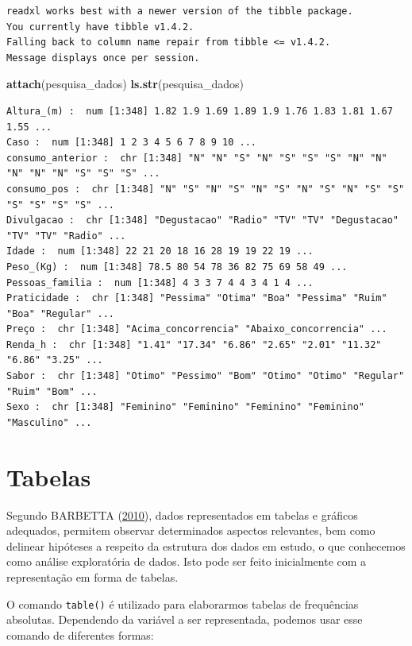 \documentclass[12pt,brazil,oneside]{book}
\newenvironment{Shaded}{\begin{snugshade}}{\end{snugshade}}
\newcommand{\KeywordTok}[1]{\textcolor[rgb]{0.13,0.29,0.53}{\textbf{#1}}}
\newcommand{\NormalTok}[1]{#1}
\begin{document}
\begin{verbatim}
readxl works best with a newer version of the tibble package.
You currently have tibble v1.4.2.
Falling back to column name repair from tibble <= v1.4.2.
Message displays once per session.
\end{verbatim}

\begin{Shaded}
\begin{Highlighting}[]
\KeywordTok{attach}\NormalTok{(pesquisa_dados)}
\KeywordTok{ls.str}\NormalTok{(pesquisa_dados)}
\end{Highlighting}
\end{Shaded}

\begin{verbatim}
Altura_(m) :  num [1:348] 1.82 1.9 1.69 1.89 1.9 1.76 1.83 1.81 1.67 1.55 ...
Caso :  num [1:348] 1 2 3 4 5 6 7 8 9 10 ...
consumo_anterior :  chr [1:348] "N" "N" "S" "N" "S" "S" "S" "N" "N" "N" "N" "N" "S" "S" "S" ...
consumo_pos :  chr [1:348] "N" "S" "N" "S" "N" "S" "N" "S" "N" "S" "S" "S" "S" "S" "S" ...
Divulgacao :  chr [1:348] "Degustacao" "Radio" "TV" "TV" "Degustacao" "TV" "TV" "Radio" ...
Idade :  num [1:348] 22 21 20 18 16 28 19 19 22 19 ...
Peso_(Kg) :  num [1:348] 78.5 80 54 78 36 82 75 69 58 49 ...
Pessoas_familia :  num [1:348] 4 3 3 7 4 4 3 4 1 4 ...
Praticidade :  chr [1:348] "Pessima" "Otima" "Boa" "Pessima" "Ruim" "Boa" "Regular" ...
Preço :  chr [1:348] "Acima_concorrencia" "Abaixo_concorrencia" ...
Renda_h :  chr [1:348] "1.41" "17.34" "6.86" "2.65" "2.01" "11.32" "6.86" "3.25" ...
Sabor :  chr [1:348] "Otimo" "Pessimo" "Bom" "Otimo" "Otimo" "Regular" "Ruim" "Bom" ...
Sexo :  chr [1:348] "Feminino" "Feminino" "Feminino" "Feminino" "Masculino" ...
\end{verbatim}

\hypertarget{tabelas}{%
\section{Tabelas}\label{tabelas}}

Segundo BARBETTA (\protect\hyperlink{ref-barbetta1988}{2010}), dados representados em tabelas e gráficos adequados, permitem observar determinados aspectos relevantes, bem como delinear hipóteses a respeito da estrutura dos dados em estudo, o que conhecemos como análise exploratória de dados. Isto pode ser feito inicialmente com a representação em forma de tabelas.

O comando \texttt{table()} é utilizado para elaborarmos tabelas de frequências absolutas. Dependendo da variável a ser representada, podemos usar esse comando de diferentes formas:
\end{document}
